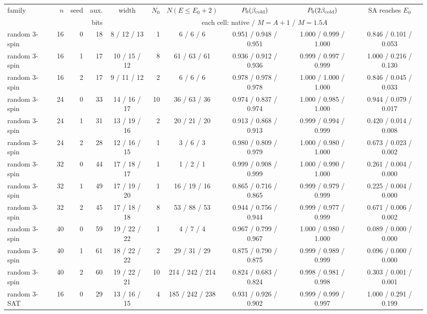 \begin{tabular}{lrr r c r c c c c}
\toprule
family & $n$ & seed & aux. & width & $N_0$ & $N(E\le E_0{+}2)$ & $P_0(\beta_{\rm cold})$ & $P_0(2\beta_{\rm cold})$ & SA reaches $E_0$ \\
& & & bits & \multicolumn{6}{c}{each cell: native / $M{=}A{+}1$ / $M{=}1.5A$} \\
\midrule
random 3-spin & 16 & 0 & 18 & 8 / 12 / 13 & 1 & 6 / 6 / 6 & 0.951 / 0.948 / 0.951 & 1.000 / 0.999 / 1.000 & 0.846 / 0.101 / 0.053 \\
random 3-spin & 16 & 1 & 17 & 10 / 15 / 12 & 8 & 61 / 63 / 61 & 0.936 / 0.912 / 0.936 & 0.999 / 0.997 / 0.999 & 1.000 / 0.216 / 0.130 \\
random 3-spin & 16 & 2 & 17 & 9 / 11 / 12 & 2 & 6 / 6 / 6 & 0.978 / 0.978 / 0.978 & 1.000 / 1.000 / 1.000 & 0.846 / 0.045 / 0.033 \\
random 3-spin & 24 & 0 & 33 & 14 / 16 / 17 & 10 & 36 / 63 / 36 & 0.974 / 0.837 / 0.974 & 1.000 / 0.985 / 1.000 & 0.944 / 0.079 / 0.017 \\
random 3-spin & 24 & 1 & 31 & 13 / 19 / 16 & 2 & 20 / 21 / 20 & 0.913 / 0.868 / 0.913 & 0.999 / 0.994 / 0.999 & 0.420 / 0.014 / 0.008 \\
random 3-spin & 24 & 2 & 28 & 12 / 16 / 15 & 1 & 3 / 6 / 3 & 0.980 / 0.809 / 0.979 & 1.000 / 0.980 / 1.000 & 0.673 / 0.023 / 0.002 \\
random 3-spin & 32 & 0 & 44 & 17 / 18 / 17 & 1 & 1 / 2 / 1 & 0.999 / 0.908 / 0.999 & 1.000 / 0.990 / 1.000 & 0.261 / 0.004 / 0.000 \\
random 3-spin & 32 & 1 & 49 & 17 / 19 / 20 & 1 & 16 / 19 / 16 & 0.865 / 0.716 / 0.865 & 0.999 / 0.979 / 0.999 & 0.225 / 0.004 / 0.000 \\
random 3-spin & 32 & 2 & 45 & 17 / 18 / 18 & 8 & 53 / 88 / 53 & 0.944 / 0.756 / 0.944 & 0.999 / 0.977 / 0.999 & 0.671 / 0.006 / 0.002 \\
random 3-spin & 40 & 0 & 59 & 19 / 22 / 22 & 1 & 4 / 7 / 4 & 0.967 / 0.799 / 0.967 & 1.000 / 0.980 / 1.000 & 0.089 / 0.000 / 0.000 \\
random 3-spin & 40 & 1 & 61 & 18 / 22 / 22 & 2 & 29 / 31 / 29 & 0.875 / 0.790 / 0.875 & 0.999 / 0.989 / 0.999 & 0.096 / 0.000 / 0.000 \\
random 3-spin & 40 & 2 & 60 & 19 / 22 / 21 & 10 & 214 / 242 / 214 & 0.824 / 0.683 / 0.824 & 0.998 / 0.981 / 0.998 & 0.303 / 0.001 / 0.001 \\
random 3-SAT & 16 & 0 & 29 & 13 / 16 / 15 & 4 & 185 / 242 / 238 & 0.931 / 0.926 / 0.902 & 0.999 / 0.999 / 0.997 & 1.000 / 0.291 / 0.199 \\

\end{tabular}
